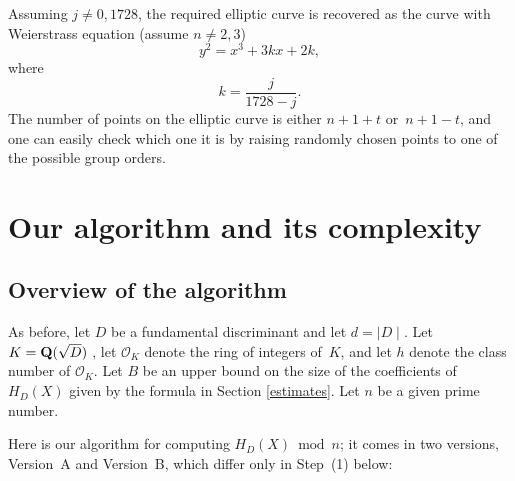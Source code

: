 \documentclass{amsart}
\newcommand{\Q}{{\bf{Q}}}
\newcommand{\F}{{\bf{F}}}
\newcommand{\OO}{\mathcal{O}}
\newcommand{\Ell}{{\rm{Ell}}}
\newcommand{\Mid}{\mid\!\!}
\newcommand{\miD}{\!\!\mid}
\newcommand{\noi}{\noindent}
\newcommand{\bigo}{{\rm O}}
\theoremstyle{plain}
\begin{document}
Assuming $j \neq 0, 1728$, the required elliptic curve is recovered as 
the curve with Weierstrass equation (assume $n \ne 2,3$)
$$y^2=x^3+3kx+2k,$$
where $$k=\frac{j}{1728-j}.$$
The number of points on the elliptic curve is either
$n+1+t$ or~$n+1-t$, and one can easily check which one
it is by raising randomly chosen points to one of the possible group orders.

\section{Our algorithm and its complexity} \label{section:algo}

\subsection{Overview of the algorithm} \label{algo-overview}


As before, let $D$ be a fundamental discriminant and let $d = \Mid D \miD$.
Let $K = \Q(\sqrt{D})$ , let $\OO_K$ denote the ring
of integers of~$K$, and let $h$ denote the class number of $\OO_K$.      
Let $B$ be an upper bound on the size of the coefficients of~$H_D(X)$
given by the formula in Section \ref{estimates}.
Let $n$ be a given prime number.

Here is our algorithm for computing $H_D(X) \bmod n$; it comes
in two versions, Version~A and Version~B, which differ
only in Step~(1) below:

%
%
\end{document}
